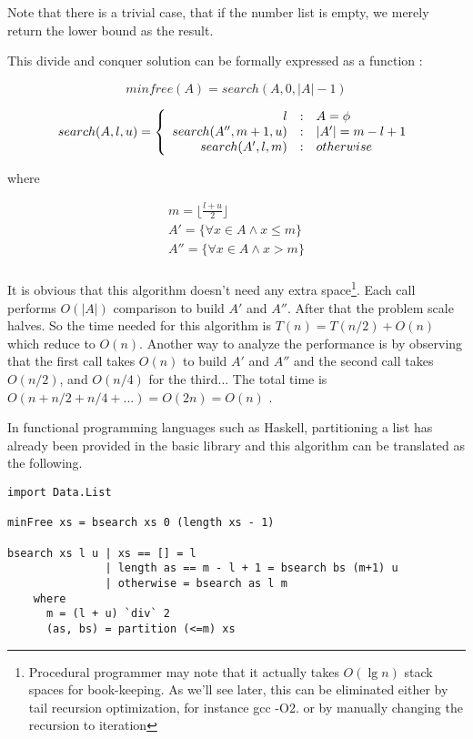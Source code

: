 \documentclass[UTF8]{article}
\begin{document}
Note that there is a trivial case, that if the number list is
empty, we merely return the lower bound as the result.

This divide and conquer solution can be formally expressed
as a function :

\[
minfree(A) = search(A, 0, |A|-1)
\]

\[
search(A, l, u) = \left \{
       \begin{array}
       {r@{\quad:\quad}l}
       l & A = \phi \\
       search(A'', m+1, u) &  |A'| = m - l + 1 \\
       search(A',  l, m) & otherwise
       \end{array}
\right.
\]

where

\[ \begin{array}{l}
m = \displaystyle \lfloor \frac{l+u}{2} \rfloor \\
A'  = \{ \forall x \in A \wedge x \leq m \} \\
A'' = \{ \forall x \in A \wedge x > m \} \\
\end{array} \]

It is obvious that this algorithm doesn't need any extra
space\footnote{Procedural programmer may note that it
actually takes $O(\lg n)$ stack spaces for book-keeping. As
we'll see later, this can be eliminated either by tail
recursion optimization, for instance gcc -O2. or by manually
changing the recursion to iteration}. Each call
performs $O(|A|)$ comparison to build $A'$ and $A''$.
After that the problem scale halves.
So the time needed for this algorithm is $T(n) = T(n/2) + O(n)$
which reduce to $O(n)$. Another way to analyze the performance
is by observing that the first call takes $O(n)$
to build $A'$ and $A''$ and the second call takes
$O(n/2)$, and $O(n/4)$ for the third... The total
time is $O(n + n/2 + n/4 + ...) = O(2n) = O(n)$ .

In functional programming languages such as Haskell,
partitioning a list has already been provided in the basic library
and this algorithm can be translated as the following.

\lstset{language=Haskell}
\begin{lstlisting}
import Data.List

minFree xs = bsearch xs 0 (length xs - 1)

bsearch xs l u | xs == [] = l
               | length as == m - l + 1 = bsearch bs (m+1) u
               | otherwise = bsearch as l m
    where
      m = (l + u) `div` 2
      (as, bs) = partition (<=m) xs
\end{lstlisting}
\end{document}
